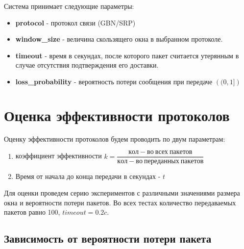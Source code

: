 \documentclass[a4paper,12pt]{article}
\begin{document}
Система принимает следующие параметры:
\begin{itemize}
    \item \textbf{protocol} - протокол связи (GBN/SRP)
    \item \textbf{window\_size} - величина скользящего окна в выбранном 
        протоколе.
    \item \textbf{timeout} - время в секундах, после которого пакет считается
        утерянным в случае отсутствия подтверждения его доставки.
    \item \textbf{loss\_probability} - вероятность потери сообщения при
        передаче $\left((0, 1]\right)$
\end{itemize}

\section{Оценка эффективности протоколов}

Оценку эффективности протоколов будем проводить по двум параметрам:
\begin{enumerate}
    \item коэффициент эффективности $k = \dfrac{кол-во~всех~пакетов}{кол-во 
        ~переданных~пакетов}$
    \item Время от начала до конца передачи в секундах - $t$ 
\end{enumerate}

Для оценки проведем серию экспериментов с различными значениями размера окна
и вероятности потери пакетов. Во всех тестах количество передаваемых пакетов 
равно 100, $timeout = 0.2 c.$

\subsection{Зависимость от вероятности потери пакета}
\end{document}
